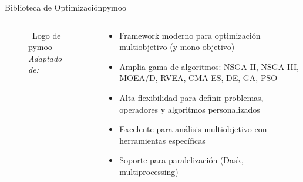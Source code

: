 \begin{frame}{Biblioteca de Optimización}{pymoo}
    \begin{columns}
        \begin{column}{0.4\textwidth}
            \centering
            \begin{figure}[H]
                \centering
                \vspace{-0.25cm}
                \caption{\tiny~Logo de pymoo \textit{Adaptado de:}~\cite{blank2020}}%
                \label{fig:pymoo_logo}
            \end{figure}
        \end{column}
        \begin{column}{0.6\textwidth}
            \begin{itemize}
                \small
                \item Framework moderno para optimización multiobjetivo (y mono-objetivo)
                \item Amplia gama de algoritmos: NSGA-II, NSGA-III, MOEA/D, RVEA, CMA-ES, DE, GA, PSO
                \item Alta flexibilidad para definir problemas, operadores y algoritmos personalizados
                \item Excelente para análisis multiobjetivo con herramientas específicas
                \item Soporte para paralelización (Dask, multiprocessing)
            \end{itemize}
        \end{column}
    \end{columns}
\end{frame}

